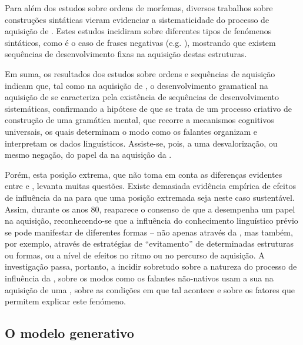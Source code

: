 \documentclass[output=paper]{LSP/langsci}
\begin{document}
Para além dos estudos sobre ordens de morfemas, diversos trabalhos sobre construções sintáticas vieram evidenciar a sistematicidade do processo de aquisição de . Estes estudos incidiram sobre diferentes tipos de fenómenos sintáticos, como é o caso de frases negativas (e.g. \citealt{wode1978}), mostrando que existem sequências de desenvolvimento fixas na aquisição destas estruturas.

Em suma, os resultados dos estudos sobre ordens e sequências de aquisição indicam que, tal como na aquisição de , o desenvolvimento gramatical na aquisição de  se caracteriza pela existência de sequências de desenvolvimento sistemáticas, confirmando a hipótese de que se trata de um processo criativo de construção de uma gramática mental, que recorre a mecanismos cognitivos universais, os quais determinam o modo como os falantes organizam e interpretam os dados linguísticos. Assiste-se, pois, a uma desvalorização, ou mesmo negação, do papel da  na aquisição da . 

Porém, esta posição extrema, que não toma em conta as diferenças evidentes entre  e , levanta muitas questões. Existe demasiada evidência empírica de efeitos de influência da  na  para que uma posição extremada seja neste caso sustentável. Assim, durante os anos 80, reaparece o consenso de que a  desempenha um papel na aquisição, reconhecendo-se que a influência do conhecimento linguístico prévio se pode manifestar de diferentes formas – não apenas através da , mas também, por exemplo, através de estratégias de ``evitamento'' de determinadas estruturas ou formas, ou a nível de efeitos no ritmo ou no percurso de aquisição. A investigação passa, portanto, a incidir sobretudo sobre a natureza do processo de influência da , sobre os modos como os falantes não-nativos usam a sua  na aquisição de uma , sobre as condições em que tal acontece e sobre os fatores que permitem explicar este fenómeno.

\subsection{O modelo generativo}
\label{subsec:madeira_modelo_generativo}
\end{document}
